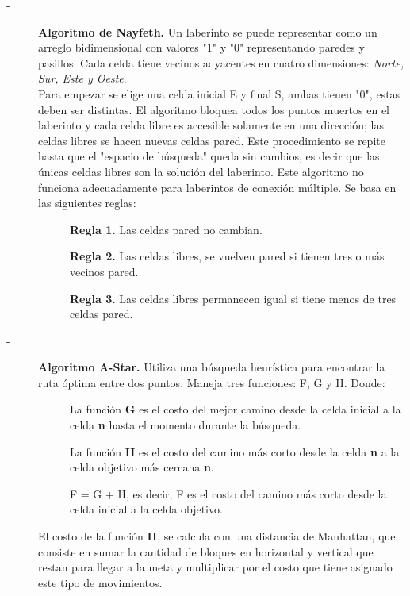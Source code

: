 \begin{description}
	    \item[-]\textbf{Algoritmo de Nayfeth.} Un laberinto se puede representar como un arreglo bidimensional con valores "1" y "0" representando paredes y pasillos. Cada celda tiene vecinos adyacentes en cuatro dimensiones: \textit{Norte, Sur, Este y Oeste}.\\
	    Para empezar se elige una celda inicial E y final S, ambas tienen "0", estas deben ser distintas. El algoritmo bloquea todos los puntos muertos en el laberinto y cada celda libre es accesible solamente en una dirección; las celdas libres se hacen nuevas celdas pared. Este procedimiento se repite hasta que el "espacio de búsqueda" queda sin cambios, es decir que las únicas celdas libres son la solución del laberinto. Este algoritmo no funciona adecuadamente para laberintos de conexión múltiple. Se basa en las siguientes reglas: 
	    \begin{description}
	        \item[ ]\textbf{Regla 1.} Las celdas pared no cambian.
	        \item[ ]\textbf{Regla 2.} Las celdas libres, se vuelven pared si tienen tres o más vecinos pared.
	        \item[ ]\textbf{Regla 3.} Las celdas libres permanecen igual si tiene menos de tres celdas pared.
	    \end{description}
	    
	    \item[-]\textbf{Algoritmo A-Star.} Utiliza una búsqueda heurística para encontrar la ruta óptima entre dos puntos. Maneja tres funciones: F, G y H. Donde:
	    \begin{description}
	        \item[ ] La función \textbf{G} es el costo del mejor camino desde la celda inicial a la celda \textbf{n} hasta el momento durante la búsqueda.
	        \item[ ] La función \textbf{H} es el costo del camino más corto desde la celda \textbf{n} a la celda objetivo más cercana \textbf{n}.
	        \item [ ] F = G + H, es decir,  F es el costo del camino más corto desde la celda inicial a la celda objetivo.
	    \end{description}
	    \noindent El costo de la función \textbf{H}, se calcula con una distancia de Manhattan, que consiste en sumar la cantidad de bloques en horizontal y vertical que restan para llegar a la meta y multiplicar por el costo que tiene asignado este tipo de movimientos.
	\end{description}
\newpage
